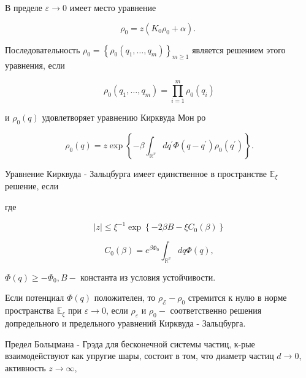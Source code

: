 \documentclass[10pt]{article}
\begin{document}
В пределе $\varepsilon \rightarrow 0$ имеет место уравнение



\[

\rho_{0}=z\left(K_{0} \rho_{0}+\alpha\right) \text {. }

\]



Последовательность $\rho_{0}=\left\{\rho_{0}\left(q_{1}, \ldots, q_{m}\right)\right\}_{m \geqslant 1}$ является решением этого уравнения, если



\[

\rho_{0}\left(q_{1}, \ldots, q_{m}\right)=\prod_{i=1}^{m} \rho_{0}\left(q_{i}\right)

\]



и $\rho_{0}(q)$ удовлетворяет уравнению Кирквуда Мон ро



\[

\rho_{0}(q)=z \exp \left\{-\beta \int_{\mathbb{R}^{v}} d q^{\prime} \Phi\left(q-q^{\prime}\right) \rho_{0}\left(q^{\prime}\right)\right\} .

\]



Уравнение Кирквуда - Зальцбурга имеет единственное в пространстве $\mathbb{E}_{\xi}$ решение, если



где



\[

|z| \leqslant \xi^{-1} \exp \left\{-2 \beta B-\xi C_{0}(\beta)\right\}

\]



\[

C_{0}(\beta)=e^{\beta \Phi_{0}} \int_{\mathbb{R}^{v}} d q \Phi(q),

\]



$\Phi(q) \geqslant-\Phi_{0}, B-$ константа из условия устойчивости.



Если потенциал $\Phi(q)$ положителен, то $\rho_{\mathcal{E}}-\rho_{0}$ стремится к нулю в норме пространства $\mathbb{E}_{\xi}$ при $\varepsilon \rightarrow 0$, если $\rho_{\varepsilon}$ и $\rho_{0}-$ соответственно решения допредельного и предельного уравнений Кирквуда - Зальцбурга.



Предел Больцмана - Грэда для бесконечной системы частиц, к-рые взаимодействуют как упругие шары, состоит в том, что диаметр частиц $d \rightarrow 0$, активность $z \rightarrow \infty$,
\end{document}
